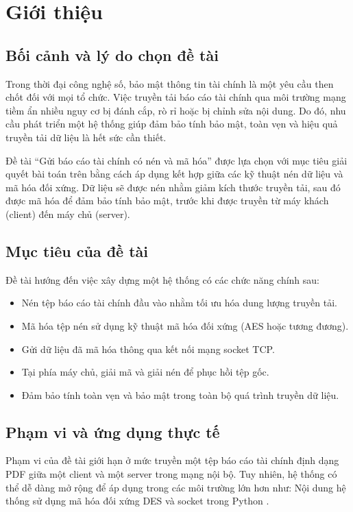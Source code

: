\chapter{Giới thiệu}

\section{Bối cảnh và lý do chọn đề tài}

Trong thời đại công nghệ số, bảo mật thông tin tài chính là một yêu cầu then chốt đối với mọi tổ chức. Việc truyền tải báo cáo tài chính qua môi trường mạng tiềm ẩn nhiều nguy cơ bị đánh cắp, rò rỉ hoặc bị chỉnh sửa nội dung. Do đó, nhu cầu phát triển một hệ thống giúp đảm bảo tính bảo mật, toàn vẹn và hiệu quả truyền tải dữ liệu là hết sức cần thiết.

Đề tài “Gửi báo cáo tài chính có nén và mã hóa” được lựa chọn với mục tiêu giải quyết bài toán trên bằng cách áp dụng kết hợp giữa các kỹ thuật nén dữ liệu và mã hóa đối xứng. Dữ liệu sẽ được nén nhằm giảm kích thước truyền tải, sau đó được mã hóa để đảm bảo tính bảo mật, trước khi được truyền từ máy khách (client) đến máy chủ (server).

\section{Mục tiêu của đề tài}

Đề tài hướng đến việc xây dựng một hệ thống có các chức năng chính sau:

\begin{itemize}
  \item Nén tệp báo cáo tài chính đầu vào nhằm tối ưu hóa dung lượng truyền tải.
  \item Mã hóa tệp nén sử dụng kỹ thuật mã hóa đối xứng (AES hoặc tương đương).
  \item Gửi dữ liệu đã mã hóa thông qua kết nối mạng socket TCP.
  \item Tại phía máy chủ, giải mã và giải nén để phục hồi tệp gốc.
  \item Đảm bảo tính toàn vẹn và bảo mật trong toàn bộ quá trình truyền dữ liệu.
\end{itemize}

\section{Phạm vi và ứng dụng thực tế}

Phạm vi của đề tài giới hạn ở mức truyền một tệp báo cáo tài chính định dạng PDF giữa một client và một server trong mạng nội bộ. Tuy nhiên, hệ thống có thể dễ dàng mở rộng để áp dụng trong các môi trường lớn hơn như:
Nội dung hệ thống sử dụng mã hóa đối xứng DES \cite{desAlgorithm} và socket trong Python \cite{pythonSocket}.

